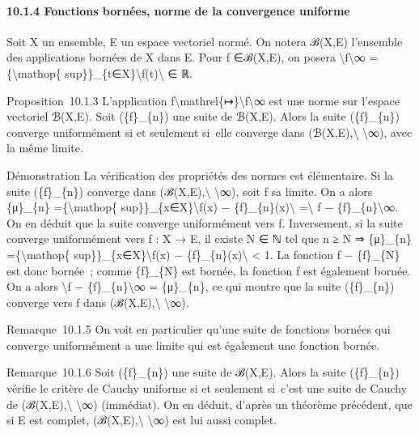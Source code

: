 \documentclass[]{article}
\begin{document}
\paragraph{10.1.4 Fonctions bornées, norme de la convergence uniforme}

Soit X un ensemble, E un espace vectoriel normé. On notera ℬ(X,E)
l'ensemble des applications bornées de X dans E. Pour f ∈ℬ(X,E), on
posera \textbackslash{}\textbar{}f\textbackslash{}\textbar{}∞
=\{\textbackslash{}mathop\{
sup\}\}\_\{t∈X\}\textbackslash{}\textbar{}f(t)\textbackslash{}\textbar{}
∈ ℝ.

Proposition~10.1.3 L'application
f\textbackslash{}mathrel\{↦\}\textbackslash{}\textbar{}f\textbackslash{}\textbar{}∞
est une norme sur l'espace vectoriel ℬ(X,E). Soit (\{f\}\_\{n\}) une
suite de ℬ(X,E). Alors la suite (\{f\}\_\{n\}) converge uniformément si
et seulement si~elle converge dans (ℬ(X,E),\textbackslash{}\textbar{}
\textbackslash{}\textbar{}∞), avec la même limite.

Démonstration La vérification des propriétés des normes est élémentaire.
Si la suite (\{f\}\_\{n\}) converge dans
(ℬ(X,E),\textbackslash{}\textbar{} \textbackslash{}\textbar{}∞), soit f
sa limite. On a alors \{μ\}\_\{n\} =\{\textbackslash{}mathop\{
sup\}\}\_\{x∈X\}\textbackslash{}\textbar{}f(x) −
\{f\}\_\{n\}(x)\textbackslash{}\textbar{} =\textbackslash{}\textbar{} f
− \{f\}\_\{n\}\textbackslash{}\textbar{}∞. On en déduit que la suite
converge uniformément vers f. Inversement, si la suite converge
uniformément vers f : X → E, il existe N ∈ ℕ tel que n ≥ N ⇒
\{μ\}\_\{n\} =\{\textbackslash{}mathop\{
sup\}\}\_\{x∈X\}\textbackslash{}\textbar{}f(x) −
\{f\}\_\{n\}(x)\textbackslash{}\textbar{} \textless{} 1. La fonction f −
\{f\}\_\{N\} est donc bornée~; comme \{f\}\_\{N\} est bornée, la
fonction f est également bornée. On a alors \textbackslash{}\textbar{}f
− \{f\}\_\{n\}\textbackslash{}\textbar{}∞ = \{μ\}\_\{n\}, ce qui montre
que la suite (\{f\}\_\{n\}) converge vers f dans
(ℬ(X,E),\textbackslash{}\textbar{} \textbackslash{}\textbar{}∞).

Remarque~10.1.5 On voit en particulier qu'une suite de fonctions bornées
qui converge uniformément a une limite qui est également une fonction
bornée.

Remarque~10.1.6 Soit (\{f\}\_\{n\}) une suite de ℬ(X,E). Alors la suite
(\{f\}\_\{n\}) vérifie le critère de Cauchy uniforme si et seulement
si~c'est une suite de Cauchy de (ℬ(X,E),\textbackslash{}\textbar{}
\textbackslash{}\textbar{}∞) (immédiat). On en déduit, d'après un
théorème précédent, que si E est complet,
(ℬ(X,E),\textbackslash{}\textbar{} \textbackslash{}\textbar{}∞) est lui
aussi complet.
\end{document}
